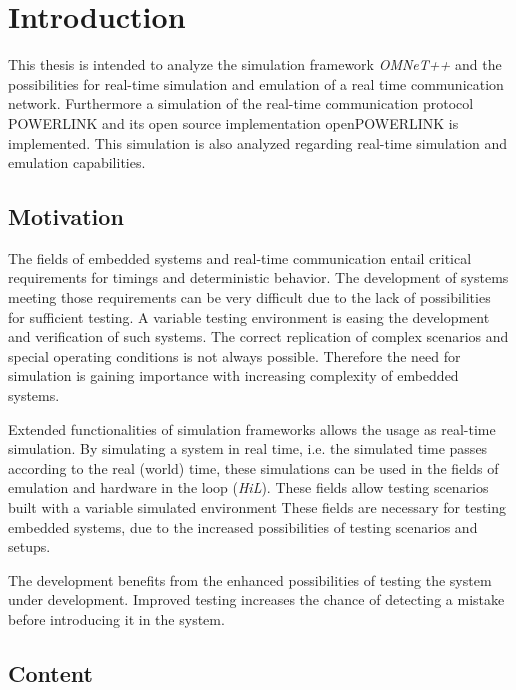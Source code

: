 \chapter{Introduction}
\label{cha:introduction}
This thesis is intended to analyze the simulation framework \emph{OMNeT++} \cite{omnet_manual} and the possibilities for real-time simulation and emulation of a real time communication network.
Furthermore a simulation of the real-time communication protocol POWERLINK and its open source implementation \mbox{openPOWERLINK} \cite{openpowerlink} is implemented. 
This simulation is also analyzed regarding real-time simulation and emulation capabilities.

\section{Motivation}
The fields of embedded systems and real-time communication entail critical requirements for timings and deterministic behavior.
The development of systems meeting those requirements can be very difficult due to the lack of possibilities for sufficient testing.
A variable testing environment is easing the development and verification of such systems.
The correct replication of complex scenarios and special operating conditions is not always possible.
Therefore the need for simulation is gaining importance with increasing complexity of embedded systems.

Extended functionalities of simulation frameworks allows the usage as real-time simulation.
By simulating a system in real time, i.e. the simulated time passes according to the real (world) time, these simulations can be used in the fields of emulation and hardware in the loop (\emph{HiL}).
These fields allow testing scenarios built with a variable simulated environment
These fields are necessary for testing embedded systems, due to the increased possibilities of testing scenarios and setups.

The development benefits from the enhanced possibilities of testing the system under development.
Improved testing increases the chance of detecting a mistake before introducing it in the system.



\section{Content}

